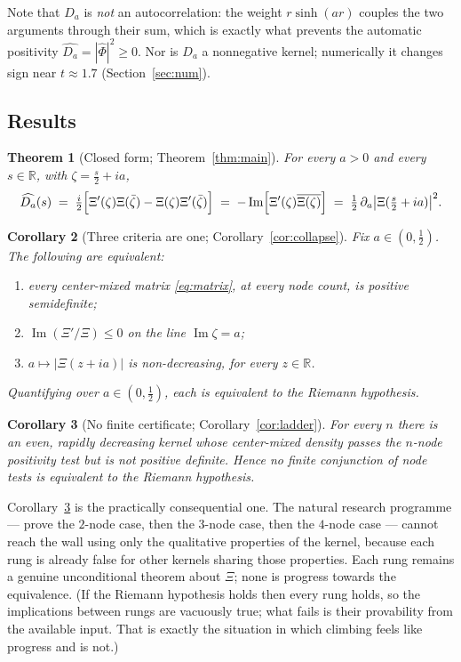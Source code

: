 \documentclass[11pt,a4paper]{amsart}
\theoremstyle{plain}
\newtheorem{theorem}{Theorem}[section]
\newtheorem{corollary}[theorem]{Corollary}
\theoremstyle{definition}
\newcommand{\RR}{\mathbb{R}}
\newcommand{\Xii}{\Xi}
\begin{document}
Note that $D_a$ is \emph{not} an autocorrelation: the weight $r\sinh(ar)$ couples the two arguments
through their sum, which is exactly what prevents the automatic positivity
$\widehat{D_a}=|\widehat\Phi|^2\ge0$. Nor is $D_a$ a nonnegative kernel; numerically it changes sign
near $t\approx1.7$ (Section~\ref{sec:num}).

\subsection{Results}

\begin{theorem}[Closed form; Theorem~\ref{thm:main}]\label{thm:A}
For every $a>0$ and every $s\in\RR$, with $\zeta=\tfrac s2+ia$,
\[
  \widehat{D_a}(s)\;=\;\tfrac i2\Bigl[\Xii'(\zeta)\Xii(\bar\zeta)-\Xii(\zeta)\Xii'(\bar\zeta)\Bigr]
  \;=\;-\operatorname{Im}\!\left[\Xii'(\zeta)\overline{\Xii(\zeta)}\right]
  \;=\;\tfrac12\,\partial_a\bigl|\Xii(\tfrac s2+ia)\bigr|^2 .
\]
\end{theorem}

\begin{corollary}[Three criteria are one; Corollary~\ref{cor:collapse}]\label{cor:A}
Fix $a\in(0,\tfrac12)$. The following are equivalent:
\begin{enumerate}
\item every center-mixed matrix \eqref{eq:matrix}, at every node count, is positive semidefinite;
\item $\operatorname{Im}(\Xii'/\Xii)\le0$ on the line $\operatorname{Im}\zeta=a$;
\item $a\mapsto|\Xii(z+ia)|$ is non-decreasing, for every $z\in\RR$.
\end{enumerate}
Quantifying over $a\in(0,\tfrac12)$, each is equivalent to the Riemann hypothesis.
\end{corollary}

\begin{corollary}[No finite certificate; Corollary~\ref{cor:ladder}]\label{cor:B}
For every $n$ there is an even, rapidly decreasing kernel whose center-mixed density passes the
$n$-node positivity test but is not positive definite. Hence no finite conjunction of node tests is
equivalent to the Riemann hypothesis.
\end{corollary}

Corollary~\ref{cor:B} is the practically consequential one. The natural research programme --- prove
the $2$-node case, then the $3$-node case, then the $4$-node case --- cannot reach the wall using
only the qualitative properties of the kernel, because each rung is already false for other kernels
sharing those properties. Each rung remains a genuine unconditional theorem about $\Xii$; none is
progress towards the equivalence. (If the Riemann hypothesis holds then every rung holds, so the
implications between rungs are vacuously true; what fails is their provability from the available
input. That is exactly the situation in which climbing feels like progress and is not.)
\end{document}
